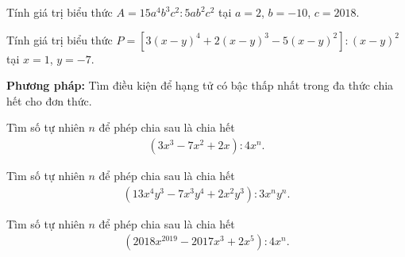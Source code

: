 \begin{vd}
Tính giá trị biểu thức $ A = 15a^4b^3c^2:5ab^2c^2$ tại $ a = 2 $, $ b =- 10 $, $ c =  2018.$
\end{vd}
\begin{vd}
Tính giá trị biểu thức 
$ P = \left[3\left( x-y\right)^4+2\left( x-y\right)^3-5\left( x-y\right)^2  \right] :\left( x-y\right)^2 $
tại $ x = 1 $, $ y = -7 $.
\end{vd}
\begin{dang}
\textbf{Phương pháp:} Tìm điều kiện để hạng tử có bậc thấp nhất trong đa thức chia hết cho đơn thức.
\end{dang}
\begin{vd}
	Tìm số tự nhiên $ n $ để phép chia sau là chia hết \begin{eqnarray*}
	\left( 3x^3 - 7x^2 + 2x \right):4x^n.	
	\end{eqnarray*}
\end{vd}
\begin{vd}
	Tìm số tự nhiên $ n $ để phép chia sau là chia hết \begin{eqnarray*}
		\left( 13x^4y^3 - 7x^3y^4 + 2x^2y^3 \right):3x^n	y^n.
	\end{eqnarray*}
\end{vd}
\begin{vd}
	Tìm số tự nhiên $ n $ để phép chia sau là chia hết \begin{eqnarray*}
		\left( 2018x^{2019} - 2017x^3 + 2x^5 \right):4x^n.	
	\end{eqnarray*}
\end{vd}
